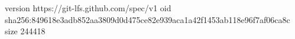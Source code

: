 version https://git-lfs.github.com/spec/v1
oid sha256:849618e3adb852aa3809d0d475ce82e939aca1a42f1453ab118e96f7af06ca8c
size 244418
